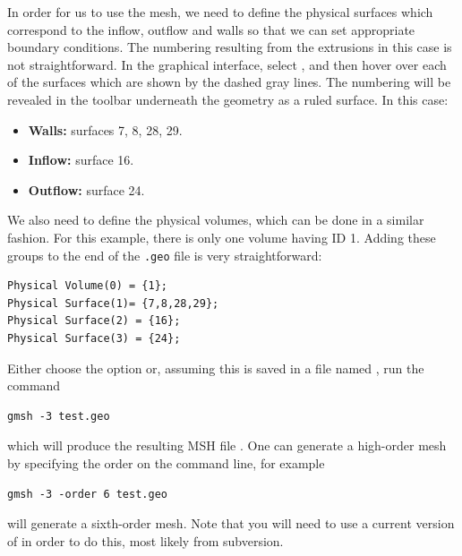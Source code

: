 In order for us to use the mesh, we need to define the physical surfaces which
correspond to the inflow, outflow and walls so that we can set appropriate
boundary conditions. The numbering resulting from the extrusions in this case is
not straightforward. In the graphical interface, select , and then hover over each of the surfaces
which are shown by the dashed gray lines. The numbering will be revealed in the
toolbar underneath the geometry as a ruled surface. In this case:
%
\begin{itemize}
\item \textbf{Walls:} surfaces 7, 8, 28, 29.
\item \textbf{Inflow:} surface 16.
\item \textbf{Outflow:} surface 24.
\end{itemize}
%
We also need to define the physical volumes, which can be done in a similar
fashion. For this example, there is only one volume having ID 1. Adding these
groups to the end of the \texttt{.geo} file is very straightforward:

\begin{lstlisting}[style=XmlStyle]
Physical Volume(0) = {1};
Physical Surface(1)= {7,8,28,29};
Physical Surface(2) = {16};
Physical Surface(3) = {24};
\end{lstlisting}
Either choose the option  or, assuming this is saved in
a file named , run the command
\begin{lstlisting}[style=BashInputStyle]
gmsh -3 test.geo
\end{lstlisting}
which will produce the resulting MSH file . One can generate a
high-order mesh by specifying the order on the command line, for example
\begin{lstlisting}[style=BashInputStyle]
gmsh -3 -order 6 test.geo
\end{lstlisting}
will generate a sixth-order mesh. Note that you will need to use a current
version of \gmsh in order to do this, most likely from subversion.

